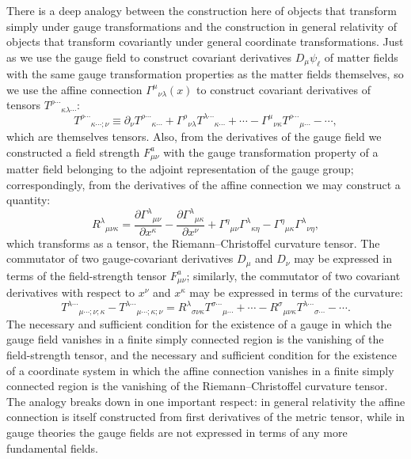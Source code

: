 There is a deep analogy between the construction here of objects that transform
simply under gauge transformations and the construction in general relativity of
objects that transform covariantly under general coordinate transformations. Just
as we use the gauge field to construct covariant derivatives $D_\mu\psi_\ell$ of
matter fields with the same gauge transformation properties as the matter fields
themselves, so we use the affine connection $\Gamma^\mu{}_{\nu\lambda}(x)$ to
construct covariant derivatives of tensors $T^{\rho\cdots}{}_{\kappa\lambda\cdots}$:
\[
 T^{\rho\cdots}{}_{\kappa\cdots;\nu}
 \equiv\partial_\nu T^{\rho\cdots}{}_{\kappa\cdots}
 +\Gamma^\rho{}_{\nu\lambda}T^{\lambda\cdots}{}_{\kappa\cdots}+\cdots
 -\Gamma^\mu{}_{\nu\kappa}T^{\rho\cdots}{}_{\mu\cdots}-\cdots ,
\]
which are themselves tensors. Also, from the derivatives of the gauge field we
constructed a field strength $F^a_{\mu\nu}$ with the gauge transformation
property of a matter field belonging to the adjoint representation of the gauge
group; correspondingly, from the derivatives of the affine connection we may
construct a quantity:
\[
 R^\lambda{}_{\mu\nu\kappa}
 =\frac{\partial\Gamma^\lambda{}_{\mu\nu}}{\partial x^\kappa}
 -\frac{\partial\Gamma^\lambda{}_{\mu\kappa}}{\partial x^\nu}
 +\Gamma^\eta{}_{\mu\nu}\Gamma^\lambda{}_{\kappa\eta}
 -\Gamma^\eta{}_{\mu\kappa}\Gamma^\lambda{}_{\nu\eta} ,
\]
which transforms as a tensor, the Riemann--Christoffel curvature tensor. The
commutator of two gauge-covariant derivatives $D_\mu$ and $D_\nu$ may be
expressed in terms of the field-strength tensor $F^a_{\mu\nu}$; similarly,
the commutator of two covariant derivatives with respect to $x^\nu$ and $x^\kappa$
may be expressed in terms of the curvature:
\[
 T^{\lambda\cdots}{}_{\mu\cdots;\nu;\kappa}
 -T^{\lambda\cdots}{}_{\mu\cdots;\kappa;\nu}
 =R^\lambda{}_{\sigma\nu\kappa}T^{\sigma\cdots}{}_{\mu\cdots}+\cdots
 -R^\sigma{}_{\mu\nu\kappa}T^{\lambda\cdots}{}_{\sigma\cdots}-\cdots .
\]
The necessary and sufficient condition for the existence of a gauge in which the
gauge field vanishes in a finite simply connected region is the vanishing of the
field-strength tensor, and the necessary and sufficient condition for the
existence of a coordinate system in which the affine connection vanishes in a
finite simply connected region is the vanishing of the Riemann--Christoffel
curvature tensor. The analogy breaks down in one important respect: in general
relativity the affine connection is itself constructed from first derivatives of
the metric tensor, while in gauge theories the gauge fields are not expressed in
terms of any more fundamental fields.
